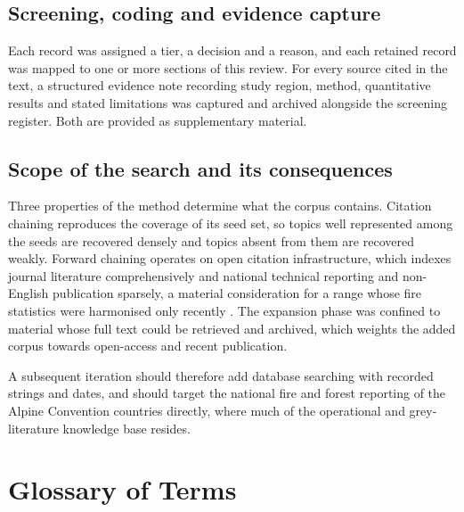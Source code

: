 \documentclass[11pt,a4paper]{article}
\begin{document}
\subsection{Screening, coding and evidence capture}

Each record was assigned a tier, a decision and a reason, and each retained record was mapped to one or more sections of this review. For every source cited in the text, a structured evidence note recording study region, method, quantitative results and stated limitations was captured and archived alongside the screening register. Both are provided as supplementary material.

\subsection{Scope of the search and its consequences}

Three properties of the method determine what the corpus contains. Citation chaining reproduces the coverage of its seed set, so topics well represented among the seeds are recovered densely and topics absent from them are recovered weakly. Forward chaining operates on open citation infrastructure, which indexes journal literature comprehensively and national technical reporting and non-English publication sparsely, a material consideration for a range whose fire statistics were harmonised only recently \citep{valese_wildfires_2011, muller_forest_2020}. The expansion phase was confined to material whose full text could be retrieved and archived, which weights the added corpus towards open-access and recent publication.

A subsequent iteration should therefore add database searching with recorded strings and dates, and should target the national fire and forest reporting of the Alpine Convention countries directly, where much of the operational and grey-literature knowledge base resides.


\section{Glossary of Terms}
\end{document}
